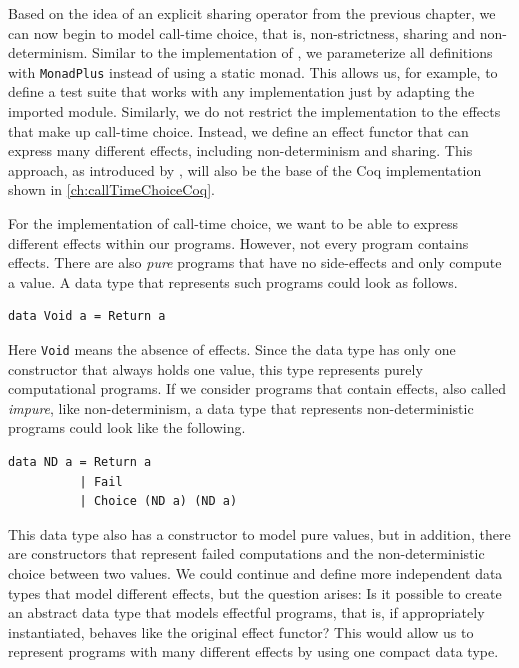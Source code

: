 \documentclass[a4paper, 11pt, fleqn, twoside, abstract=on]{scrreprt}
\newcommand{\hinl}[1]{\texttt{#1}}
\begin{document}
Based on the idea of an explicit sharing operator from the previous chapter, we can now begin to model call-time choice, that is, non-strictness, sharing and non-determinism.
Similar to the implementation of \citet{fischer2009purely}, we parameterize all definitions with \hinl{MonadPlus} instead of using a static monad.
This allows us, for example, to define a test suite that works with any implementation just by adapting the imported module.
Similarly, we do not restrict the implementation to the effects that make up call-time choice.
Instead, we define an effect functor that can express many different effects, including non-determinism and sharing.
This approach, as introduced by \citet{wu2014effect}, will also be the base of the Coq implementation shown in \autoref{ch:callTimeChoiceCoq}.

For the implementation of call-time choice, we want to be able to express different effects within our programs.
However, not every program contains effects.
There are also \textit{pure} programs that have no side-effects and only compute a value.
A data type that represents such programs could look as follows.

\begin{verbatim}
data Void a = Return a
\end{verbatim}

Here \hinl{Void} means the absence of effects. Since the data type has only one constructor that always holds one value, this type represents purely computational programs.
If we consider programs that contain effects, also called \textit{impure}, like non-determinism, a data type that represents non-deterministic programs could look like the following.

\begin{verbatim}
data ND a = Return a
          | Fail
          | Choice (ND a) (ND a)
\end{verbatim}

This data type also has a constructor to model pure values, but in addition, there are constructors that represent failed computations and the non-deterministic choice between two values.
We could continue and define more independent data types that model different effects, but the question arises: Is it possible to create an abstract data type that models effectful programs, that is, if appropriately instantiated, behaves like the original effect functor?
This would allow us to represent programs with many different effects by using one compact data type.
\end{document}
